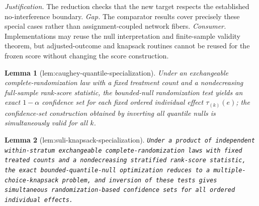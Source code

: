\documentclass{article}
\newtheorem{lemma}{Lemma}
\begin{document}
\par\smallskip\noindent \textit{Justification.} The reduction checks that the new target respects the established no-interference boundary. \textit{Gap.} The comparator results cover precisely these special cases rather than assignment-coupled network fibers. \textit{Consumer.} Implementations may reuse the null interpretation and finite-sample validity theorem, but adjusted-outcome and knapsack routines cannot be reused for the frozen score without changing the score construction.

\begin{lemma}[lem:caughey-quantile-specialization]\label{lem:caughey-quantile-specialization}
Under an exchangeable complete-randomization law with a fixed treatment count and
a nondecreasing full-sample rank-score statistic, the bounded-null randomization
test yields an exact \(1-\alpha\) confidence set for each fixed ordered individual
effect \(\tau_{(k)}(e)\); the confidence-set construction obtained by inverting all
quantile nulls is simultaneously valid for all \(k\).
\end{lemma}

\begin{lemma}[lem:suli-knapsack-specialization]\label{lem:suli-knapsack-specialization}
\texttt{Under a product of independent within-\allowbreak{}stratum exchangeable complete-\allowbreak{}randomization
laws with fixed treated counts and a nondecreasing stratified rank-\allowbreak{}score statistic,\allowbreak{}
the exact bounded-\allowbreak{}quantile-\allowbreak{}null optimization reduces to a multiple-\allowbreak{}choice-\allowbreak{}knapsack
problem,\allowbreak{} and inversion of these tests gives simultaneous randomization-\allowbreak{}based
confidence sets for all ordered individual effects.}
\end{lemma}
\end{document}
